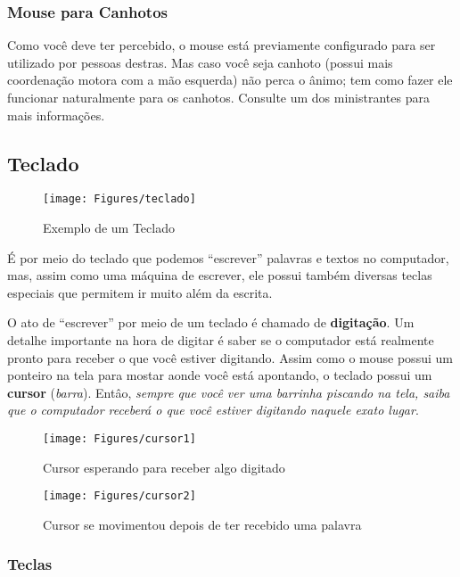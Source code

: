 \documentclass[hidelinks,12pt]{article}
\begin{document}
\subsubsection{Mouse para Canhotos}

Como você deve ter percebido, o mouse está previamente configurado para ser utilizado por pessoas destras. Mas caso você seja canhoto (possui mais coordenação motora com a mão esquerda) não perca o ânimo; tem como fazer ele funcionar naturalmente para os canhotos. Consulte um dos ministrantes para mais informações.

\subsection{Teclado}
\label{Teclado}


\begin{figure}[!h]
    \centering
	\texttt{[image: Figures/teclado]}
	\label{fig:teclado}
	\caption{Exemplo de um Teclado}
\end{figure}

É por meio do teclado que podemos ``escrever'' palavras e textos no computador, mas, assim como uma máquina de escrever, ele possui também diversas teclas especiais que permitem ir muito além da escrita. 

O ato de ``escrever'' por meio de um teclado é chamado de \textbf{digitação}. Um detalhe importante na hora de digitar é saber se o computador está realmente pronto para receber o que você estiver digitando. Assim como o mouse possui um ponteiro na tela para mostar aonde você está apontando, o teclado possui um \textbf{cursor} (\emph{barra}). Entâo, \emph{sempre que você ver uma barrinha piscando na tela, saiba que o computador receberá o que você estiver digitando naquele exato lugar}.

\begin{figure}[!h]
    \centering
	\texttt{[image: Figures/cursor1]}
	\label{fig:cursor1}
	\caption{Cursor esperando para receber algo digitado}
\end{figure}

\begin{figure}[!h]
        \centering
		\texttt{[image: Figures/cursor2]}
		\label{fig:cursor2}
		\caption{Cursor se movimentou depois de ter recebido uma palavra}
\end{figure}


\subsubsection{Teclas}
\end{document}
